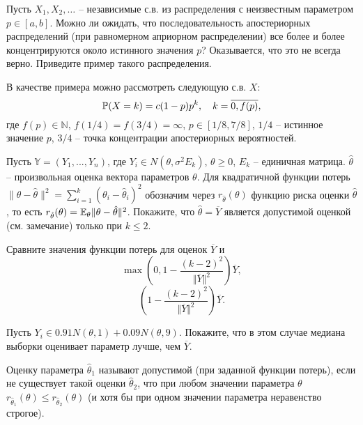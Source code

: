 \begin{problem}
Пусть $X_1, X_2, \ldots$ -- независимые с.в. из распределения с неизвестным параметром $p  \in [a, b]$. Можно ли ожидать, что последовательность апостериорных распределений (при равномерном априорном распределении) все более и более концентрируются около истинного значения $p$? Оказывается, что это не всегда верно.
Приведите пример такого распределения.   
\end{problem}

\begin{ordre}
В качестве примера можно рассмотреть следующую с.в. $X$:
\[
\mathrm{{\mathbb P}}(X = k) = c(1-p)p^k, \quad k = \overline{0, f(p)},
\]
где $f(p) \in \mathbb{N}$, $f(1/4) = f(3/4) = \infty$, $p \in [1/8, 7/8]$, $1/4$ -- истинное значение $p$, $3/4$ -- точка концентрации  апостериорных вероятностей.
\end{ordre}


\begin{problem}
Пусть $\mathbb{Y} = (Y_1, ..., Y_n)$, где $Y_i \in N(\theta, \sigma^2 E_k)$, $\theta \geq 0$, $E_k$ -- единичная матрица. $\hat{\theta}$ -- произвольная оценка вектора параметров $\theta$.  Для квадратичной функции потерь $\| \theta - \hat{\theta}\|^2 = \sum \limits_{i=1}^k (\theta_i - \hat{\theta}_i)^2$ обозначим через $r_{\hat{\theta}}(\theta)$ функцию риска оценки $\hat{\theta}$, то есть $r_{\hat{\theta}}(\theta) = \mathrm{{\mathbb E}}_{\theta} \| \theta - \hat{\theta}\|^2$.  Покажите, что $\hat{\theta} = \overline{Y}$ является допустимой оценкой (см. замечание) только при $k \leq 2$.

\begin{ordre}
Сравните значения функции потерь для оценок $\overline{Y}$ и 
\[
\max \left(0, 1 - \frac{(k-2)^2}{\Vert \overline{Y} \Vert^2} \right)\overline{Y},
\]
\[
\left(1 - \frac{(k-2)^2}{\Vert \overline{Y} \Vert^2} \right)\overline{Y}.
\]
\end{ordre}

Пусть $Y_i \in 0.91 N(\theta, 1) + 0.09 N(\theta, 9)$. Покажите, что в этом случае медиана выборки оценивает параметр лучше, чем $\overline{Y}$.
\end{problem}


\begin{remark}
Оценку параметра $\hat{\theta}_1$ называют допустимой (при заданной функции потерь), если не существует такой оценки $\hat{\theta}_2$, что при любом значении параметра $\theta$  $r_{\hat{\theta}_1}(\theta) \leq r_{\hat{\theta}_2}(\theta)$ (и хотя бы при одном значении параметра неравенство строгое).
\end{remark}

